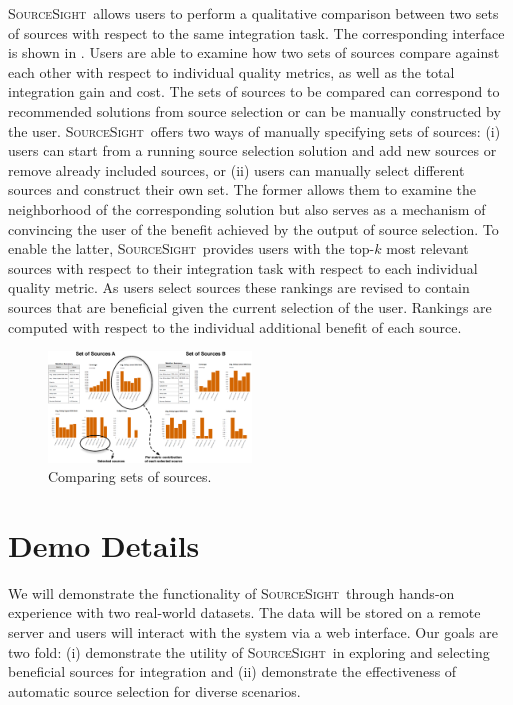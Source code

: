 \documentclass{vldb}
\newcommand\system{\textsc{SourceSight}}
\begin{document}
\system~allows users to perform a qualitative comparison between two sets of sources with respect to the same integration task. The corresponding interface is shown in . Users are able to examine how two sets of sources compare against each other with respect to individual quality metrics, as well as the total integration gain and cost. The sets of sources to be compared can correspond to recommended solutions from source selection or can be manually constructed by the user. \system~offers two ways of manually specifying sets of sources: (i) users can start from a running source selection solution and add new sources or remove already included sources, or (ii) users can manually select different sources and construct their own set. The former allows them to examine the neighborhood of the corresponding solution but also serves as a mechanism of convincing the user of the benefit achieved by the output of source selection. To enable the latter, \system~provides users with the top-$k$ most relevant sources with respect to their integration task with respect to each individual quality metric. As users select sources these rankings are revised to contain sources that are beneficial given the current selection of the user. Rankings are computed with respect to the individual additional benefit of each source. 
\begin{figure}
	\begin{center}
	\includegraphics[trim=0 0 0 0, clip,width=0.48\textwidth]{fig/compSS}
	\vspace{-20pt}
	\caption{Comparing sets of sources.}
	\label{fig:comparison}
	\vspace{-20pt}
	\end{center}
\end{figure}

\section{Demo Details}
\label{sec:details}
We will demonstrate the functionality of \system~through hands-on experience with two real-world datasets. The data will be stored on a remote server and users will interact with the system via a web interface. Our goals are two fold: (i) demonstrate the utility of \system~in exploring and selecting beneficial sources for integration and (ii) demonstrate the effectiveness of automatic source selection for diverse scenarios. 
\end{document}
